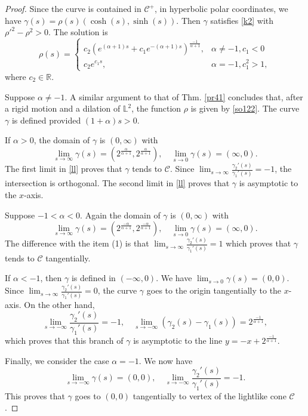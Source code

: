 \documentclass[a4paper,12pt]{amsart}
\theoremstyle{definition}
\def\r{\mathbb R}
\def\l{\mathbb L}
\begin{document}
\begin{proof}
Since the curve is contained in $\mathcal{C}^+$, in hyperbolic polar coordinates, we have $\gamma(s)=\rho(s)(\cosh(s),\sinh(s))$. Then  $\gamma$ satisfies \eqref{k2} with  $\rho'^2-\rho^2>0$.   The solution is 
\begin{equation}\label{so12}
\rho(s)= \left\{\begin{array}{ll}
c_2 \left(e^{(\alpha+1)s}+c_1 e^{-(\alpha+1)s}\right)^\frac{-1}{\alpha+1},&\alpha\not=-1, c_1<0\\
c_2e^{c_1 s},&\alpha=-1, c_1^2>1,
\end{array}\right.
\end{equation}
where $c_2\in\r$. 

Suppose $\alpha\not=-1$.  A similar argument to that of Thm. \ref{pr41} concludes that, after  a rigid motion  and a dilation of $\l^2$, the function $\rho$ is given by \eqref{so122}.  The curve $\gamma$ is defined provided $(1+\alpha)s>0$.
 
If $\alpha>0$, the domain of   $\gamma$ is $(0,\infty)$ with
\begin{equation}\label{ll}
\lim_{s\to\infty}\gamma(s)=(2^\frac{\alpha}{\alpha+1},2^\frac{\alpha}{\alpha+1}),\quad \lim_{s\to 0}\gamma(s)=(\infty,0).
\end{equation}
The first limit in \eqref{ll} proves that $\gamma$ tends to $\mathcal{C}$. Since $\lim_{s\to\infty}\frac{\gamma_2'(s)}{\gamma_1'(s)}=-1$, the intersection is orthogonal. The second limit in \eqref{ll} proves that $\gamma$ is asymptotic to the $x$-axis.

Suppose $-1<\alpha<0$. Again the domain of $\gamma$ is $(0,\infty)$  with 
$$\lim_{s\to\infty}\gamma(s)=(2^\frac{-\alpha}{\alpha+1},2^\frac{-\alpha}{\alpha+1}),\quad \lim_{s\to 0}\gamma(s)=(\infty,0).$$
The difference with the item (1) is that $\lim_{s\to\infty}\frac{\gamma_2'(s)}{\gamma_1'(s)}=1$ which proves that $\gamma$ tends to $\mathcal{C}$ tangentially.
 
If $\alpha<-1$, then $\gamma$ is defined in $(-\infty,0)$. We have $\lim_{s\to 0}\gamma(s)=(0,0)$.  Since $\lim_{s\to\infty}\frac{\gamma_2'(s)}{\gamma_1'(s)}=0$, the curve $\gamma$ goes to the origin tangentially to the $x$-axis. On the other hand, 
$$\lim_{s\to-\infty}\frac{\gamma_2'(s)}{\gamma_1'(s)}=-1,\quad \lim_{s\to-\infty} (\gamma_2(s)- \gamma_1(s))=2^\frac{-1}{\alpha+1},$$
which proves that this branch of $\gamma$ is asymptotic to the line $y=-x+2^\frac{-1}{\alpha+1}$.

Finally, we consider the case $\alpha=-1$. We now have
$$\lim_{s\to-\infty} \gamma (s) =(0,0),\quad \lim_{s\to-\infty}\frac{\gamma_2'(s)}{\gamma_1'(s)}=-1.$$
This proves that $\gamma$ goes to $(0,0)$ tangentially to vertex of the lightlike cone $\mathcal{C}$.
\end{proof}
\end{document}
